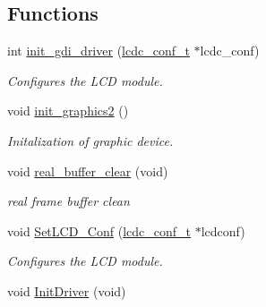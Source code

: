 \subsection*{Functions}
\begin{CompactItemize}
\item 
int \hyperlink{group__ap7000__lcd_gdaab935823d9ec8447c28b6c56b221c4}{init\_\-gdi\_\-driver} (\hyperlink{structlcdc__configuration__s}{lcdc\_\-conf\_\-t} $\ast$lcdc\_\-conf)
\begin{CompactList}\small\item\em Configures the LCD module. \item\end{CompactList}\item 
void \hyperlink{group__ap7000__lcd_g8ce36407397a9552d2fc31dc420161c8}{init\_\-graphics2} ()
\begin{CompactList}\small\item\em Initalization of graphic device. \item\end{CompactList}\item 
\hypertarget{group__ap7000__lcd_g22c97331a55371956dcd6942b2846734}{
void \hyperlink{group__ap7000__lcd_g22c97331a55371956dcd6942b2846734}{real\_\-buffer\_\-clear} (void)}
\label{group__ap7000__lcd_g22c97331a55371956dcd6942b2846734}

\begin{CompactList}\small\item\em real frame buffer clean \item\end{CompactList}\item 
void \hyperlink{group__ap7000__lcd_gb241bf31e7011997b92062d0a4777168}{SetLCD\_\-Conf} (\hyperlink{structlcdc__configuration__s}{lcdc\_\-conf\_\-t} $\ast$lcdconf)
\begin{CompactList}\small\item\em Configures the LCD module. \item\end{CompactList}\item 
\hypertarget{group__ap7000__lcd_g235164669919b33f46e08b3290006e75}{
void \hyperlink{group__ap7000__lcd_g235164669919b33f46e08b3290006e75}{InitDriver} (void)}
\label{group__ap7000__lcd_g235164669919b33f46e08b3290006e75}


\end{CompactItemize}
